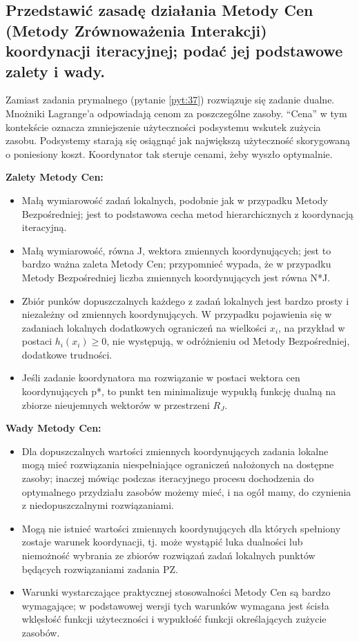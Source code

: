 \subsection{Przedstawić zasadę działania Metody Cen (Metody Zrównoważenia Interakcji) koordynacji iteracyjnej; podać jej podstawowe zalety i wady.}
Zamiast zadania prymalnego (pytanie \ref{pyt:37}) rozwiązuje się zadanie dualne. Mnożniki Lagrange'a odpowiadają cenom za poszczególne zasoby. ``Cena'' w tym kontekście oznacza zmniejszenie użyteczności podsystemu wskutek zużycia zasobu. Podsystemy starają się osiągnąć jak największą użyteczność skorygowaną o poniesiony koszt. Koordynator tak steruje cenami, żeby wyszło optymalnie.


\textbf{Zalety Metody Cen:}
\begin{itemize}
    \item Małą wymiarowość zadań lokalnych, podobnie jak w przypadku Metody Bezpośredniej; jest to podstawowa cecha metod hierarchicznych z koordynacją iteracyjną.
    \item Małą wymiarowość, równa J, wektora zmiennych koordynujących; jest to bardzo ważna zaleta Metody Cen; przypomnieć wypada, że w przypadku Metody Bezpośredniej liczba zmiennych koordynujących jest równa N*J.
    \item Zbiór punków dopuszczalnych każdego z zadań lokalnych jest bardzo prosty i niezależny od zmiennych koordynujących. W przypadku pojawienia się w zadaniach lokalnych dodatkowych ograniczeń na wielkości $x_i$, na przykład w postaci $h_i(x_i)\geq 0$, nie występują, w odróżnieniu od Metody Bezpośredniej, dodatkowe trudności.
    \item Jeśli zadanie koordynatora ma rozwiązanie w postaci wektora cen koordynujących p*, to punkt ten minimalizuje wypukłą funkcję dualną na zbiorze nieujemnych wektorów w przestrzeni $R_J$.
\end{itemize}

\textbf{Wady Metody Cen:}
\begin{itemize}
    \item Dla dopuszczalnych wartości zmiennych koordynujących zadania lokalne mogą mieć rozwiązania niespełniające ograniczeń nałożonych na dostępne zasoby; inaczej mówiąc podczas iteracyjnego procesu dochodzenia do optymalnego przydziału zasobów możemy mieć, i na ogół mamy, do czynienia z niedopuszczalnymi rozwiązaniami.
    \item Mogą nie istnieć wartości zmiennych koordynujących dla których spełniony zostaje warunek koordynacji, tj. może wystąpić luka dualności lub niemożność wybrania ze zbiorów rozwiązań zadań lokalnych punktów będących rozwiązaniami zadania PZ.
    \item Warunki wystarczające praktycznej stosowalności Metody Cen są bardzo wymagające; w podstawowej wersji tych warunków wymagana jest ścisła wklęsłość funkcji użyteczności i wypukłość funkcji określających zużycie zasobów.
\end{itemize}

